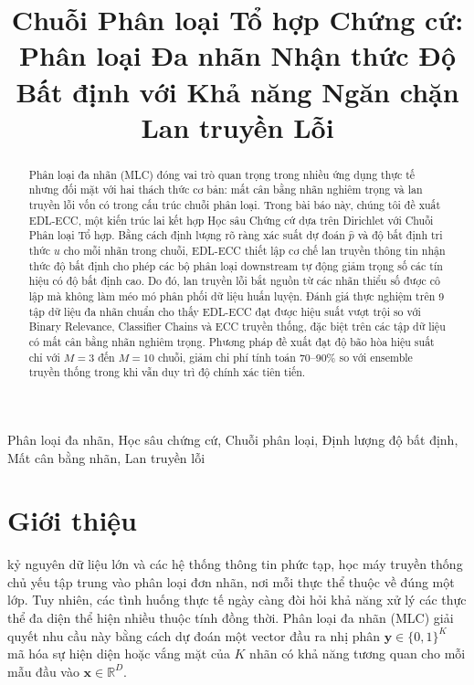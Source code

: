 \documentclass[conference]{IEEEtran}
\begin{document}
\title{Chuỗi Phân loại Tổ hợp Chứng cứ:\\
Phân loại Đa nhãn Nhận thức Độ Bất định với Khả năng Ngăn chặn Lan truyền Lỗi}

\author{
}

\maketitle

\begin{abstract}
Phân loại đa nhãn (MLC) đóng vai trò quan trọng trong nhiều ứng dụng thực tế nhưng đối mặt với hai thách thức cơ bản: mất cân bằng nhãn nghiêm trọng và lan truyền lỗi vốn có trong cấu trúc chuỗi phân loại. Trong bài báo này, chúng tôi đề xuất EDL-ECC, một kiến trúc lai kết hợp Học sâu Chứng cứ dựa trên Dirichlet với Chuỗi Phân loại Tổ hợp. Bằng cách định lượng rõ ràng xác suất dự đoán $\hat{p}$ và độ bất định tri thức $u$ cho mỗi nhãn trong chuỗi, EDL-ECC thiết lập cơ chế lan truyền thông tin nhận thức độ bất định cho phép các bộ phân loại downstream tự động giảm trọng số các tín hiệu có độ bất định cao. Do đó, lan truyền lỗi bắt nguồn từ các nhãn thiểu số được cô lập mà không làm méo mó phân phối dữ liệu huấn luyện. Đánh giá thực nghiệm trên 9 tập dữ liệu đa nhãn chuẩn cho thấy EDL-ECC đạt được hiệu suất vượt trội so với Binary Relevance, Classifier Chains và ECC truyền thống, đặc biệt trên các tập dữ liệu có mất cân bằng nhãn nghiêm trọng. Phương pháp đề xuất đạt độ bão hòa hiệu suất chỉ với $M=3$ đến $M=10$ chuỗi, giảm chi phí tính toán 70--90\% so với ensemble truyền thống trong khi vẫn duy trì độ chính xác tiên tiến.
\end{abstract}

\begin{IEEEkeywords}
Phân loại đa nhãn, Học sâu chứng cứ, Chuỗi phân loại, Định lượng độ bất định, Mất cân bằng nhãn, Lan truyền lỗi
\end{IEEEkeywords}

\section{Giới thiệu}

 kỷ nguyên dữ liệu lớn và các hệ thống thông tin phức tạp, học máy truyền thống chủ yếu tập trung vào phân loại đơn nhãn, nơi mỗi thực thể thuộc về đúng một lớp. Tuy nhiên, các tình huống thực tế ngày càng đòi hỏi khả năng xử lý các thực thể đa diện thể hiện nhiều thuộc tính đồng thời. Phân loại đa nhãn (MLC) giải quyết nhu cầu này bằng cách dự đoán một vector đầu ra nhị phân $\mathbf{y} \in \{0, 1\}^K$ mã hóa sự hiện diện hoặc vắng mặt của $K$ nhãn có khả năng tương quan cho mỗi mẫu đầu vào $\mathbf{x} \in \mathbb{R}^D$.
\end{document}
